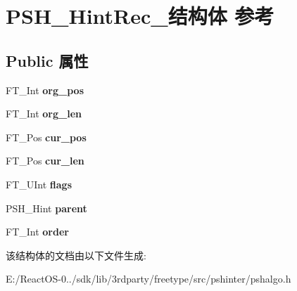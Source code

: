 \hypertarget{struct_p_s_h___hint_rec__}{}\section{P\+S\+H\+\_\+\+Hint\+Rec\+\_\+结构体 参考}
\label{struct_p_s_h___hint_rec__}
\subsection*{Public 属性}
\begin{DoxyCompactItemize}
\item 
\mbox{\label{struct_p_s_h___hint_rec___a5b9c43cb55883d1c5c6ebc14cc20589c}} 
F\+T\+\_\+\+Int {\bfseries org\+\_\+pos}
\item 
\mbox{\label{struct_p_s_h___hint_rec___a9fddbd1ef916b07d369ffbaddf03e01f}} 
F\+T\+\_\+\+Int {\bfseries org\+\_\+len}
\item 
\mbox{\label{struct_p_s_h___hint_rec___a1f1db2a58ece5aa38d0090e042e48dbb}} 
F\+T\+\_\+\+Pos {\bfseries cur\+\_\+pos}
\item 
\mbox{\label{struct_p_s_h___hint_rec___a5c648acdfd57863e8d5090ac857e35b0}} 
F\+T\+\_\+\+Pos {\bfseries cur\+\_\+len}
\item 
\mbox{\label{struct_p_s_h___hint_rec___a4b45f06c14abc6d3f0cbdd3138517e25}} 
F\+T\+\_\+\+U\+Int {\bfseries flags}
\item 
\mbox{\label{struct_p_s_h___hint_rec___a5ce3cd9fa37a643f25938a41dc6dcdb9}} 
P\+S\+H\+\_\+\+Hint {\bfseries parent}
\item 
\mbox{\label{struct_p_s_h___hint_rec___a4b813e4588e82ddf024b87831bedc766}} 
F\+T\+\_\+\+Int {\bfseries order}
\end{DoxyCompactItemize}


该结构体的文档由以下文件生成\+:\begin{DoxyCompactItemize}
\item 
E\+:/\+React\+O\+S-\/0../sdk/lib/3rdparty/freetype/src/pshinter/pshalgo.\+h\end{DoxyCompactItemize}
